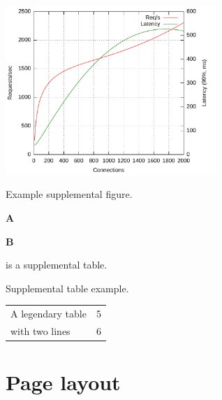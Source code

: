 \begin{suppfigure}[tb]
    \centering
    \includegraphics[width=0.6\textwidth]{figures/just-a-plot}
    \caption{Example supplemental figure.}
    \label{suppfig:vector}
\end{suppfigure}

\begin{suppfigure}[t]
    \begin{subsuppfigure}[b]{.5\linewidth}
        \centering
        \textbf{\sffamily A}\\[-0.5\onelineskip]
    \end{subsuppfigure}%
    \begin{subsuppfigure}[b]{.5\linewidth}
        \centering
        \textbf{\sffamily B}\\[-0.5\onelineskip]
    \end{subsuppfigure}
    \caption[Supplemental two animals and their emojis.]{%
        Supplemental two animals and their emojis.
         cats and  dogs.
    }
    \label{suppfig:subfigure-demo}
\end{suppfigure}

 is a supplemental table.

\begin{supptable}[b]
    \centering
    \caption{Supplemental table example.}
    \label{supptab:table-demo}
    \begin{tabular}{lc} \toprule
    A legendary table & 5 \\
    with two lines    & 6 \\ \bottomrule
    \end{tabular}
\end{supptable}

\clearpage


\section{Page layout}
\layout
\clearpage

